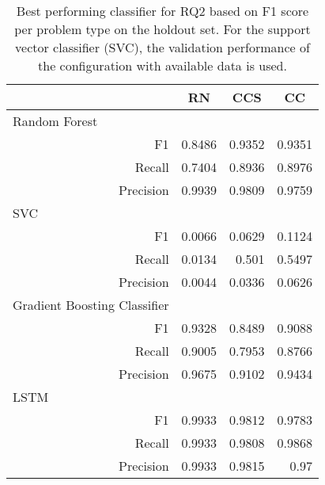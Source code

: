 \begin{table}[ht]
    \centering
    \begin{tabular}{rrrr}
    \toprule
    \multicolumn{1}{l}{}                             & \multicolumn{1}{c}{RN}         & \multicolumn{1}{c}{CCS} & \multicolumn{1}{c}{CC} \\ \midrule
    \multicolumn{1}{l}{Random Forest}                &  &            &              \\
    F1                                               & 0.8486               & 0.9352     & 0.9351       \\
    Recall                                           & 0.7404               & 0.8936     & 0.8976       \\
    Precision                                        & 0.9939               & 0.9809     & 0.9759       \\ \midrule
    \multicolumn{1}{l}{SVC}                          &                      &            &              \\
    F1                                               &   0.0066             &  0.0629    &   0.1124     \\
    Recall                                           &   0.0134             &  0.501    &   0.5497     \\
    Precision                                        &   0.0044             &  0.0336    &   0.0626      \\ \midrule
    \multicolumn{1}{l}{Gradient Boosting Classifier} &                      &            &              \\
    F1                                               & 0.9328               & 0.8489     & 0.9088       \\
    Recall                                           & 0.9005               & 0.7953     & 0.8766       \\
    Precision                                        & 0.9675               & 0.9102     & 0.9434       \\ \midrule
    \multicolumn{1}{l}{LSTM}                         &                      &            &              \\
    F1                                               & 0.9933               & 0.9812     & 0.9783       \\
    Recall                                           & 0.9933               & 0.9808     & 0.9868       \\
    Precision                                        & 0.9933               & 0.9815     & 0.97       \\ \bottomrule
    \end{tabular}
    \caption[Best performing classifier for RQ2]{Best performing classifier for RQ2 based on F1 score per problem type on the holdout set. For the support vector classifier (SVC), the validation performance of the configuration with available data is used.}
    \label{tab:rq2_best_classifier}
    \end{table}